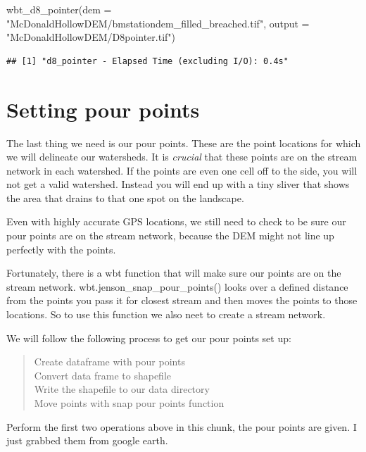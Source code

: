 \documentclass[
]{book}
\newenvironment{Shaded}{\begin{snugshade}}{\end{snugshade}}
\newcommand{\AttributeTok}[1]{\textcolor[rgb]{0.77,0.63,0.00}{#1}}
\newcommand{\FunctionTok}[1]{\textcolor[rgb]{0.00,0.00,0.00}{#1}}
\newcommand{\NormalTok}[1]{#1}
\newcommand{\StringTok}[1]{\textcolor[rgb]{0.31,0.60,0.02}{#1}}
\begin{document}
\begin{Shaded}
\begin{Highlighting}[]
\FunctionTok{wbt\_d8\_pointer}\NormalTok{(}\AttributeTok{dem =} \StringTok{"McDonaldHollowDEM/bmstationdem\_filled\_breached.tif"}\NormalTok{,}
               \AttributeTok{output =} \StringTok{"McDonaldHollowDEM/D8pointer.tif"}\NormalTok{)}
\end{Highlighting}
\end{Shaded}

\begin{verbatim}
## [1] "d8_pointer - Elapsed Time (excluding I/O): 0.4s"
\end{verbatim}

\hypertarget{setting-pour-points}{%
\section{Setting pour points}\label{setting-pour-points}}

The last thing we need is our pour points. These are the point locations for which we will delineate our watersheds. It is \emph{crucial} that these points are on the stream network in each watershed. If the points are even one cell off to the side, you will not get a valid watershed. Instead you will end up with a tiny sliver that shows the area that drains to that one spot on the landscape.

Even with highly accurate GPS locations, we still need to check to be sure our pour points are on the stream network, because the DEM might not line up perfectly with the points.

Fortunately, there is a wbt function that will make sure our points are on the stream network. wbt.jenson\_snap\_pour\_points() looks over a defined distance from the points you pass it for closest stream and then moves the points to those locations. So to use this function we also neet to create a stream network.

We will follow the following process to get our pour points set up:

\begin{quote}
Create dataframe with pour points\\
Convert data frame to shapefile\\
Write the shapefile to our data directory\\
Move points with snap pour points function
\end{quote}

Perform the first two operations above in this chunk, the pour points are given. I just grabbed them from google earth.
\end{document}
